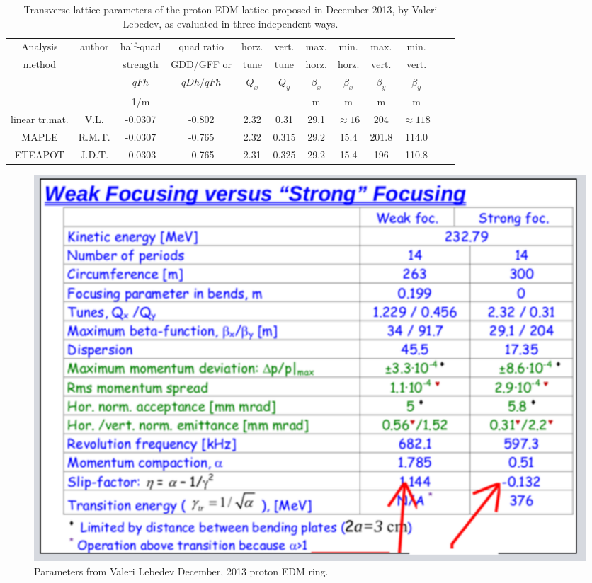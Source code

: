 \documentclass[12]{article}
\begin{document}
%
\begin{table}[h]
\caption{\label{tbl:TransverseParams}Transverse lattice parameters of the proton EDM 
lattice proposed in December 2013, by Valeri Lebedev\cite{Benchmark-I}, as evaluated 
in three independent ways.
} 
\medskip
\centering
\begin{tabular}{|c|c|c|c|c|c|c|c|c|c|c|c|}           \hline
Analysis   & author    & half-quad & quad ratio & horz. & vert. &     max.     &     min.      &     max.      &     min.      \\
 method    &           &  strength & GDD/GFF or & tune  & tune  &    horz.     &     horz.     &    vert.      &    vert.      \\ 
           &           &  $qFh$    & $qDh/qFh$  & $Q_x$ & $Q_y$ &   $\beta_x$   &   $\beta_x$   &   $\beta_y$   & $\beta_y$     \\ \hline
           &           &   1/m     &            &       &       &       m       &      m        &      m        &      m        \\ \hline
linear tr.mat. &  V.L. & -0.0307   &  -0.802    & 2.32  & 0.31  &      29.1     & $\approx16$   &    204        &  $\approx118$ \\     
MAPLE      & R.M.T.    & -0.0307   &  -0.765    & 2.32  & 0.315 &      29.2     &    15.4       &   201.8       &   114.0       \\ 
ETEAPOT    & J.D.T.    & -0.0303   &  -0.765    & 2.31  & 0.325 &      29.2     &    15.4       &    196        &   110.8       \\  
\hline
\end{tabular}
\end{table}
%
\begin{figure}[hbt]
\centering
\includegraphics[scale=0.7]{pdf/ValLebedevDec2013-mod.pdf}
\caption{\label{fig:ValLebedevDec2013-parms}Parameters from Valeri Lebedev December, 
2013 proton EDM ring.}
\end{figure}
\end{document}
